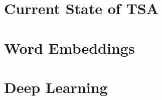 \documentclass[../../fyp.tex]{subfiles}
\begin{document}
\section{Current State of TSA}


% 

\section{Word Embeddings}


\section{Deep Learning}


% 

% 
\end{document}
